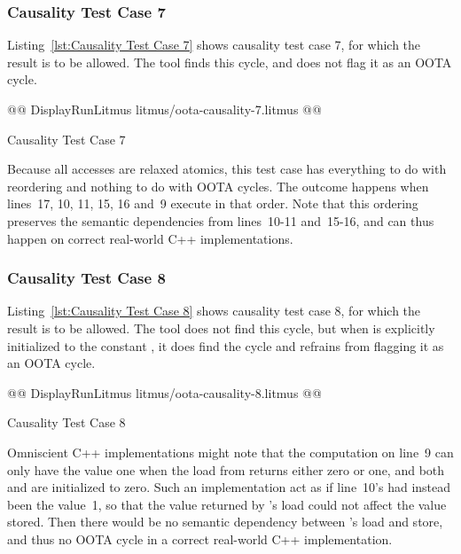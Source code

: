 \documentclass[10]{article}
\begin{document}
\subsubsection{Causality Test Case 7}
\label{app:Causality Test Case 7}

Listing~\ref{lst:Causality Test Case 7}
shows causality test case 7, for which the 
result is to be allowed.
The  tool finds this cycle, and does not flag it as an OOTA cycle.

\begin{listing}[tbp]
@@ DisplayRunLitmus litmus/oota-causality-7.litmus @@
\caption{Causality Test Case 7}
\label{lst:Causality Test Case 7}
\end{listing}

Because all accesses are relaxed atomics, this test case has everything
to do with reordering and nothing to do with OOTA cycles.
The outcome happens when lines~17, 10, 11, 15, 16 and~9 execute in that
order.
Note that this ordering preserves the semantic dependencies from
lines~10-11 and~15-16, and can thus happen on correct real-world
C++ implementations.

\subsubsection{Causality Test Case 8}
\label{app:Causality Test Case 8}

Listing~\ref{lst:Causality Test Case 8}
shows causality test case 8, for which the 
result is to be allowed.
The  tool does not find this cycle, but when  is explicitly
initialized to the constant , it does find the cycle and refrains
from flagging it as an OOTA cycle.

\begin{listing}[tbp]
@@ DisplayRunLitmus litmus/oota-causality-8.litmus @@
\caption{Causality Test Case 8}
\label{lst:Causality Test Case 8}
\end{listing}

Omniscient C++ implementations might note that the computation on line~9
can only have the value one when the load from  returns either
zero or one, and both  and  are initialized to zero.
Such an implementation act as if line~10's  had instead been
the value~1, so that the value returned by 's load could not
affect the value stored.
Then there would be no semantic dependency between 's load
and store, and thus no OOTA cycle in a correct real-world C++
implementation.
\end{document}
